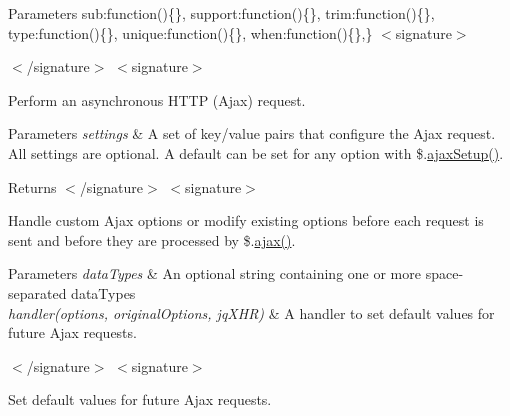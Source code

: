 \begin{DoxyParams}{Parameters}
\textquotesingle{}sub\textquotesingle{}\+:function()\{\}, \textquotesingle{}support\textquotesingle{}\+:function()\{\}, \textquotesingle{}trim\textquotesingle{}\+:function()\{\}, \textquotesingle{}type\textquotesingle{}\+:function()\{\}, \textquotesingle{}unique\textquotesingle{}\+:function()\{\}, \textquotesingle{}when\textquotesingle{}\+:function()\{\},\} $<$signature$>$ 
 $<$/signature$>$ $<$signature$>$ \\
\hline
\end{DoxyParams}
Perform an asynchronous H\+T\+T\+P (Ajax) request.


\begin{DoxyParams}{Parameters}
{\em settings} & A set of key/value pairs that configure the Ajax request. All settings are optional. A default can be set for any option with \$.\hyperlink{obj_2_release_2_package_2_package_tmp_2_scripts_2jquery-1_810_82_8js_a52a40924d02e0d9756f051e36a640cd6}{ajax\+Setup()}.\\
\hline
\end{DoxyParams}
\begin{DoxyReturn}{Returns}
$<$/signature$>$ $<$signature$>$ 

Handle custom Ajax options or modify existing options before each request is sent and before they are processed by \$.\hyperlink{obj_2_release_2_package_2_package_tmp_2_scripts_2jquery_8validate_8js_a77004c0fdc08a5bc07afa0b099cdf6df}{ajax()}.
\end{DoxyReturn}

\begin{DoxyParams}{Parameters}
{\em data\+Types} & An optional string containing one or more space-\/separated data\+Types\\
\hline
{\em handler(options, original\+Options, jq\+X\+H\+R)} & A handler to set default values for future Ajax requests.\\
\hline
\end{DoxyParams}
$<$/signature$>$ $<$signature$>$ 

Set default values for future Ajax requests.


